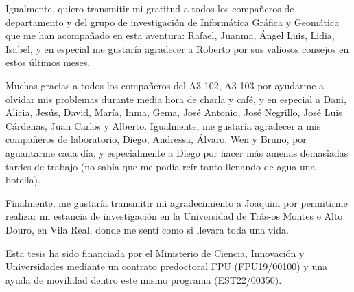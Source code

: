 \noindent Igualmente, quiero transmitir mi gratitud a todos los compañeros de departamento y del grupo de investigación de Informática Gráfica y Geomática que me han acompañado en esta aventura: Rafael, Juanma, Ángel Luis, Lidia, Isabel, y en especial me gustaría agradecer a Roberto por sus valiosos consejos en estos últimos meses. 

\noindent Muchas gracias a todos los compañeros del A3-102, A3-103 por ayudarme a olvidar mis problemas durante media hora de charla y café, y en especial a Dani, Alicia, Jesús, David, María, Inma, Gema, José Antonio, José Negrillo, José Luis Cárdenas, Juan Carlos y Alberto. Igualmente, me gustaría agradecer a mis compañeros de laboratorio, Diego, Andressa, Álvaro, Wen y Bruno, por aguantarme cada día, y especialmente a Diego por hacer más amenas demasiadas tardes de trabajo (no sabía que me podía reír tanto llenando de agua una botella). 

\noindent Finalmente, me gustaría transmitir mi agradecimiento a Joaquim por permitirme realizar mi estancia de investigación en la Universidad de Trás-os Montes e Alto Douro, en Vila Real, donde me sentí como si llevara toda una vida. 

\vspace{50mm} 

\noindent Esta tesis ha sido financiada por el Ministerio de Ciencia, Innovación y Universidades mediante un contrato predoctoral FPU (FPU19/00100) y una ayuda de movilidad dentro este mismo programa (EST22/00350).  

